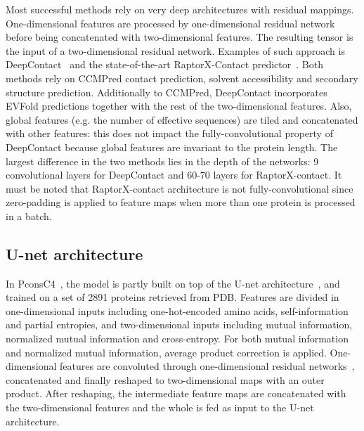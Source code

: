         Most successful methods rely on very deep architectures with residual mappings.
        One-dimensional features are processed by one-dimensional residual network
        before being concatenated with two-dimensional features. The resulting tensor
        is the input of a two-dimensional residual network.
        Examples of such approach is DeepContact~\cite{DeepContact} and the state-of-the-art
        RaptorX-Contact predictor~\cite{RaptorX}. Both methods rely on CCMPred contact
        prediction, solvent accessibility and secondary structure prediction.
        Additionally to CCMPred, DeepContact incorporates EVFold predictions together
        with the rest of the two-dimensional features. Also, global features (e.g. the number
        of effective sequences) are tiled and concatenated with other features: this does
        not impact the fully-convolutional property of DeepContact because global features
        are invariant to the protein length.
        The largest difference in the two methods lies in the depth of the networks:
        9 convolutional layers for DeepContact and 60-70 layers for RaptorX-contact.
        It must be noted that RaptorX-contact architecture is not fully-convolutional
        since zero-padding is applied to feature maps when more than one protein
        is processed in a batch.

    \subsection{U-net architecture}

        In PconsC4~\cite{Michel383133}, the model is partly built on top of the U-net
        architecture~\cite{DBLP:journals/corr/RonnebergerFB15}, and trained on a set
        of 2891 proteins retrieved from PDB. Features are divided in one-dimensional
        inputs including one-hot-encoded amino acids, self-information and
        partial entropies, and two-dimensional inputs including mutual information,
        normalized mutual information and cross-entropy.
        For both mutual information and normalized mutual information,
        average product correction is applied.
        One-dimensional features are convoluted through one-dimensional residual networks~,
        concatenated and finally reshaped to two-dimensional maps with an outer product.
        After reshaping, the intermediate feature maps are concatenated with the
        two-dimensional features and the whole is fed as input to the U-net architecture.

